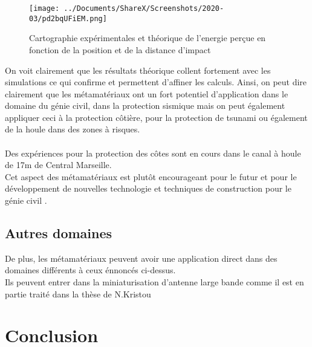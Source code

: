 \documentclass[12pt,a4paper]{article}
\begin{document}
\begin{figure}[hbtp]
\centering
\texttt{[image: ../Documents/ShareX/Screenshots/2020-03/pd2bqUFiEM.png]}
\caption{Cartographie expérimentales et théorique de l'energie perçue en fonction de la position et de la distance d'impact}
\end{figure}
		\newpage On voit clairement que les résultats théorique collent fortement avec les simulations ce qui confirme et permettent d’affiner les calculs. 
Ainsi, on peut dire clairement que les métamatériaux ont un fort potentiel d’application dans le domaine du génie civil, dans la protection sismique mais on peut également appliquer ceci à la protection côtière, pour la protection de tsunami ou également de la houle dans des zones à risques.\cite{2} \\ \\

	Des expériences pour la protection des côtes sont en cours dans le canal à houle de 17m de Central Marseille.\cite{3}\\
	
	Cet aspect des métamatériaux est plutôt encourageant pour le futur et pour le développement de nouvelles technologie et techniques de construction pour le génie civil .

\subsection{Autres domaines}
	De plus, les métamatériaux peuvent avoir une application direct dans des domaines différents à ceux énnoncés ci-dessus. \\
	Ils peuvent entrer dans la miniaturisation d'antenne large bande comme il est en partie traité dans la thèse de N.Kristou\cite{4}
	
	
	
\section{Conclusion}
	
\newpage 

\listoffigures


	


	
	





 
\end{document}
